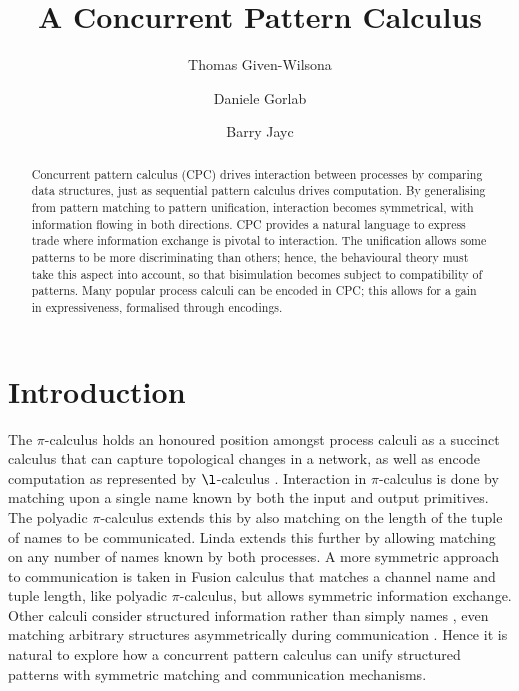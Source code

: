 \documentclass{LMCS}
\title[A Concurrent Pattern Calculus]{A Concurrent Pattern Calculus\rsuper*}
\author[T.~Given-Wilson]{Thomas Given-Wilson\rsuper a}	\address{{\lsuper a}INRIA, Paris, France}	\email{thomas.given-wilson@inria.fr}  \thanks{{\lsuper a}The first author has been partially supported by the project ANR-12-IS02-001 PACE}
\author[D.~Gorla]{Daniele Gorla\rsuper b}	\address{{\lsuper b}Dip.~di Informatica, ``Sapienza'' Universit\`a di Roma}	\email{gorla@di.uniroma1.it}
\author[B.~Jay]{Barry Jay\rsuper c}	\address{{\lsuper c}University of Technology, Sydney}	\email{Barry.Jay@uts.edu.au}
\begin{document}
\makeatactive





\maketitle  

\begin{abstract}
Concurrent pattern calculus (CPC) drives interaction between processes by
  comparing data structures, just as sequential pattern calculus
  drives computation. By generalising from pattern matching to pattern
  unification, interaction becomes symmetrical, with information
  flowing in both directions.
  CPC provides a natural language to express trade where information
  exchange is pivotal to interaction.
The unification allows some patterns to be more discriminating than
  others; hence, the behavioural theory must take this aspect into
  account, so that bisimulation becomes subject to compatibility of patterns.
Many popular process calculi can be encoded in CPC; this allows for a
  gain in expressiveness, formalised through encodings.

\end{abstract} 

\section{Introduction}
\label{sec:intro}



The $\pi$-calculus \cite{milner.parrow.ea:calculus-mobile,sangiorgi.walker:theory-mobile} 
holds an honoured position amongst process calculi as a succinct calculus that can capture topological changes in a network, as well as encode computation as represented by $\l$-calculus \cite{Barendregt85}.
Interaction in $\pi$-calculus is done by matching upon a single name known by both the input and output primitives.
The polyadic $\pi$-calculus extends this by also matching on the length of the tuple of names to be communicated.
Linda \cite{Gel85} extends this further by allowing matching on any number of names known by both processes.
A more symmetric approach to communication is taken in Fusion calculus \cite{parrow.victor:fusion-calculus} 
that matches a channel name and tuple length, like polyadic $\pi$-calculus, but allows symmetric information exchange.
Other calculi consider structured information rather than simply names \cite{gordon1997ccp},
even matching arbitrary structures asymmetrically during communication \cite{BJPV11}.
Hence it is natural to explore how a concurrent pattern calculus can unify structured patterns with symmetric matching and communication mechanisms.
\end{document}
